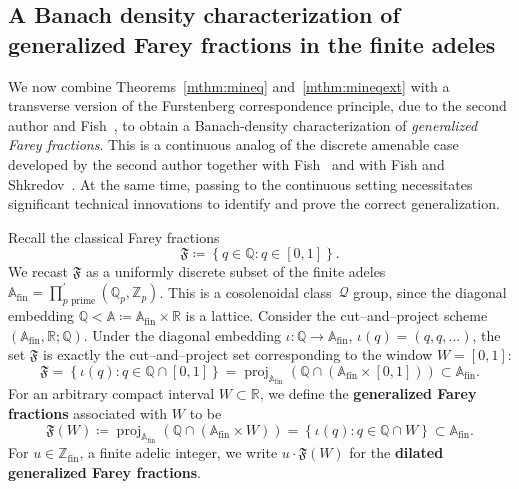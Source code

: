 \documentclass{amsart}
\numberwithin{equation}{subsection}
\theoremstyle{remark}
\begin{document}
\subsection{A Banach density characterization of generalized Farey fractions in the finite adeles}

We now combine Theorems~\ref{mthm:mineq} and~\ref{mthm:mineqext} with a transverse version of the Furstenberg correspondence principle, due to the second author and Fish~\cite{BjFi2024}, to obtain a Banach-density characterization of {\em generalized Farey fractions}. This is a continuous analog of the discrete amenable case developed by the second author together with Fish~\cite{BjFi2019} and with Fish and Shkredov~\cite{BjFi2021}. At the same time, passing to the continuous setting necessitates significant technical innovations to identify and prove the correct generalization.

Recall the classical Farey fractions
\[\mathfrak{F}\coloneqq\left\{ q\in\mathbb{Q}: q\in\left[0,1\right]\right\}.\]
We recast \(\mathfrak{F}\) as a uniformly discrete subset of the finite adeles \(\mathbb{A}_{\mathrm{fin}}=\prod\nolimits_{p\text{ prime}}^{\prime}\left(\mathbb{Q}_{p},\mathbb{Z}_{p}\right)\). This is a cosolenoidal class~\(\mathcal{Q}\) group, since the diagonal embedding \(\mathbb{Q}<\mathbb{A}\coloneqq\mathbb{A}_{\mathrm{fin}}\times\mathbb{R}\) is a lattice. Consider the cut--and--project scheme \(\left(\mathbb{A}_{\mathrm{fin}},\mathbb{R};\mathbb{Q}\right)\). Under the diagonal embedding \(\iota:\mathbb{Q}\to\mathbb{A}_{\mathrm{fin}}\), \(\iota\left(q\right)=\left(q,q,\dotsc\right)\), the set \(\mathfrak{F}\) is exactly the cut--and--project set corresponding to the window \(W=\left[0,1\right]\):
\[\mathfrak{F}=\left\{\iota\left(q\right): q\in\mathbb{Q}\cap\left[0,1\right]\right\}=\operatorname{proj}_{\mathbb{A}_{\mathrm{fin}}}\left(\mathbb{Q}\cap\left(\mathbb{A}_{\mathrm{fin}}\times\left[0,1\right]\right)\right)\subset\mathbb{A}_{\mathrm{fin}}.\]
For an arbitrary compact interval \(W\subset\mathbb{R}\), we define the {\bf generalized Farey fractions} associated with \(W\) to be
\[\mathfrak{F}\left(W\right)\coloneqq\operatorname{proj}_{\mathbb{A}_{\mathrm{fin}}}\left(\mathbb{Q}\cap\left(\mathbb{A}_{\mathrm{fin}}\times W\right)\right)=\left\{\iota\left(q\right): q\in\mathbb{Q}\cap W\right\}\subset\mathbb{A}_{\mathrm{fin}}.\]
For \(u\in\mathbb{Z}_{\mathrm{fin}}\), a finite adelic integer, we write \(u\cdot\mathfrak{F}\left(W\right)\) for the {\bf dilated generalized Farey fractions}.
\end{document}
